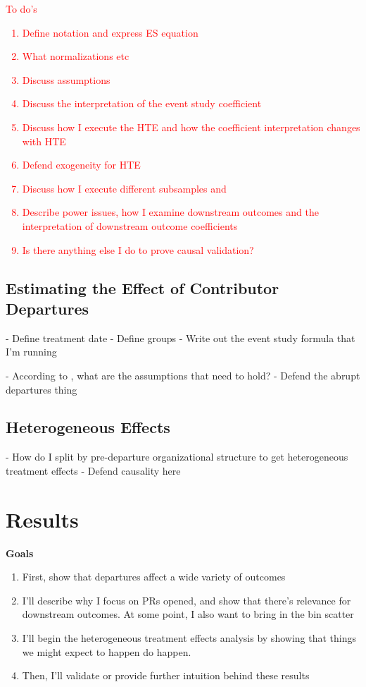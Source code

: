 \documentclass[12pt,notitlepage]{article}
\begin{document}
\textcolor{red}{To do's
\begin{enumerate}
    \item Define notation and express ES equation
    \item What normalizations etc
    \item Discuss assumptions
    \item Discuss the interpretation of the event study coefficient
    \item Discuss how I execute the HTE and how the coefficient interpretation changes with HTE
    \item Defend exogeneity for HTE
    \item Discuss how I execute different subsamples and 
    \item Describe power issues, how I examine downstream outcomes and the interpretation of downstream outcome coefficients
    \item Is there anything else I do to prove causal validation?
\end{enumerate}}

\subsection{Estimating the Effect of Contributor Departures}
- Define treatment date
- Define groups
- Write out the event study formula that I'm running

- According to \cite{freyaldenhoven_visualization_2021}, what are the assumptions that need to hold?
- Defend the abrupt departures thing
\subsection{Heterogeneous Effects}
- How do I split by pre-departure organizational structure to get heterogeneous treatment effects
- Defend causality here

\section{Results} \label{sec:result}
\textbf{Goals}
\begin{enumerate}
    \item First, show that departures affect a wide variety of outcomes
    \item I'll describe why I focus on PRs opened, and show that there's relevance for downstream outcomes. At some point, I also want to bring in the bin scatter
    \item I'll begin the heterogeneous treatment effects analysis by showing that things we might expect to happen do happen. 
    \item Then, I'll validate or provide further intuition behind these results
\end{enumerate}
\end{document}
